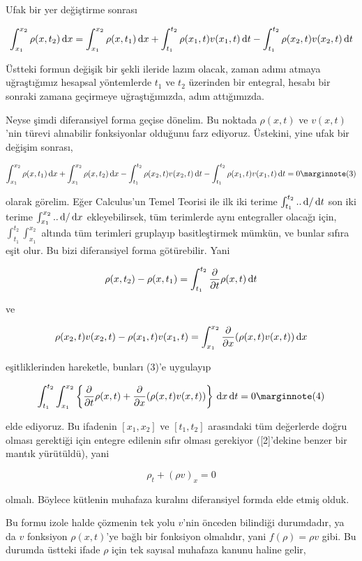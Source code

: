 \documentclass[12pt,fleqn]{article}\usepackage{../../common}
\begin{document}
Ufak bir yer değiştirme sonrası

$$
\int _{x_1}^{x_2} \rho(x,t_2) \,\mathrm{d} x =
\int _{x_1}^{x_2} \rho(x,t_1) \,\mathrm{d} x  +
\int_{t_1}^{t_2} \rho(x_1,t) v(x_1,t) \,\mathrm{d} t -
\int_{t_1}^{t_2}  \rho(x_2,t) v(x_2,t) \,\mathrm{d} t
$$

Üstteki formun değişik bir şekli ileride lazım olacak, zaman adımı atmaya
uğraştığımız hesapsal yöntemlerde $t_1$ ve $t_2$ üzerinden bir entegral, hesabı
bir sonraki zamana geçirmeye uğraştığımızda, adım attığımızda.

Neyse şimdi diferansiyel forma geçise dönelim. Bu noktada $\rho(x,t)$ ve
$v(x,t)$'nin türevi alınabilir fonksiyonlar olduğunu farz ediyoruz. Üstekini,
yine ufak bir değişim sonrası,

$$
\int _{x_1}^{x_2} \rho(x,t_1) \ud x  +
\int _{x_1}^{x_2} \rho(x,t_2) \ud x -
\int_{t_1}^{t_2}  \rho(x_2,t) v(x_2,t) \ud t -
\int_{t_1}^{t_2} \rho(x_1,t) v(x_1,t) \ud t = 0
\mlabel{3}
$$

olarak görelim. Eğer Calculus'un Temel Teorisi ile ilk iki terime
$\int_{t_1}^{t_2} .. \,\mathrm{d} / \,\mathrm{d} t$ son iki terime $\int_{x_1}^{x_2} .. \,\mathrm{d} / \,\mathrm{d} x$
ekleyebilirsek, tüm terimlerde aynı entegraller olacağı için, 
$\int_{t_1}^{t_2} \int_{x_1}^{x_2} $ altında tüm terimleri gruplayıp
basitleştirmek mümkün, ve bunlar sıfıra eşit olur. Bu bizi diferansiyel
forma götürebilir. Yani

$$
\rho(x,t_2) - \rho(x,t_1) = \int_{t_1}^{t_2}
\frac{\partial }{\partial t} \rho(x,t) \,\mathrm{d} t
$$

ve

$$
\rho(x_2,t)v(x_2,t) - \rho(x_1,t)v(x_1,t) =
\int _{x_1}^{x_2} \frac{\partial }{\partial x} (\rho(x,t)v(x,t)) \,\mathrm{d} x
$$

eşitliklerinden hareketle, bunları (3)'e uygulayıp

$$
\int _{t_1}^{t_2} \int _{x_1}^{x_2}  \left\{
\frac{\partial }{\partial t} \rho(x,t)  +
\frac{\partial }{\partial x} (\rho(x,t)v(x,t))
\right\} \ud x \ud t = 0
\mlabel{4}
$$

elde ediyoruz. Bu ifadenin $[x_1,x_2]$ ve $[t_1,t_2]$ arasındaki tüm değerlerde
doğru olması gerektiği için entegre edilenin sıfır olması gerekiyor ([2]'dekine
benzer bir mantık yürütüldü), yani

$$
\rho_t + (\rho v)_x = 0
$$

olmalı. Böylece kütlenin muhafaza kuralını diferansiyel formda elde etmiş olduk.

Bu formu izole halde çözmenin tek yolu $v$'nin önceden bilindiği durumdadır, ya
da $v$ fonksiyon $\rho(x,t)$'ye bağlı bir fonksiyon olmalıdır, yani
$f(\rho) = \rho v$ gibi. Bu durumda üstteki ifade $\rho$ için tek sayısal
muhafaza kanunu haline gelir,
\end{document}
